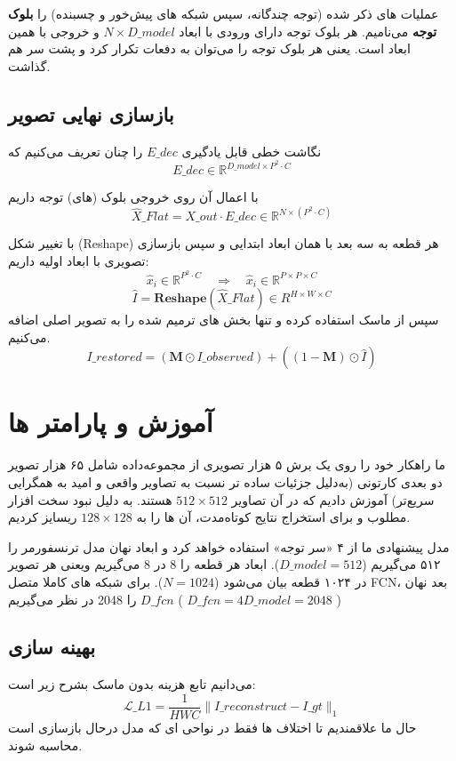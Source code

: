 عملیات های ذکر شده (توجه چندگانه، سپس شبکه های پیش‌خور و چسبنده) را \textbf{بلوک توجه} می‌نامیم. هر بلوک توجه دارای ورودی با ابعاد $ N \times D\_{model} $ و خروجی با همین ابعاد است. یعنی هر بلوک توجه را می‌توان به دفعات تکرار کرد و پشت سر هم گذاشت.

\subsection{بازسازی نهایی تصویر}
نگاشت خطی قابل یادگیری $E\_{dec}$ را چنان تعریف می‌کنیم که 
$$
E\_{dec} \in \mathbb{R}^{D\_{model} \times P^2 \cdot C}
$$

با اعمال آن روی خروجی بلوک (های) توجه داریم
$$
\hat{X}\_{Flat} = X\_{out} \cdot E\_{dec} \in \mathbb{R}^{N \times (P^2 \cdot C)}
$$

با تغییر شکل (Reshape) هر قطعه به سه بعد با همان ابعاد ابتدایی و سپس بازسازی تصویری با ابعاد اولیه داریم:
$$
\hat{x}_i \in \mathbb{R}^{P^2 \cdot C} \quad \Rightarrow \quad \hat{x}_i \in \mathbb{R}^{P \times P \times C}
$$
$$
\hat{I} = \mathbf{Reshape}(\hat{X}\_{Flat}) \in R^{H \times W \times C}
$$
سپس از ماسک استفاده کرده و تنها بخش های ترمیم شده را به تصویر اصلی اضافه می‌کنیم.
$$
I\_{restored} = (\mathbf{M} \odot I\_{observed}) + ((1-\mathbf{M}) \odot \hat{I})
$$

\section{آموزش و پارامتر ها}

ما راهکار خود را روی یک برش ۵ هزار تصویری از مجموعه‌داده  
\cite{danbooru2019Portraits}
شامل ۶۵ هزار تصویر دو بعدی کارتونی (به‌دلیل جزئیات ساده تر نسبت به تصاویر واقعی و امید به همگرایی سریع‌تر) آموزش دادیم که در آن  تصاویر $ 512 \times 512 $ هستند.  به دلیل نبود سخت افزار مطلوب و برای استخراج نتایج کوتاه‌مدت، آن ها را به $128 \times 128 $ ریسایز کردیم.

مدل پیشنهادی ما از ۴‌ «سر توجه» استفاده خواهد کرد و ابعاد نهان مدل ترنسفورمر را ۵۱۲ می‌گیریم ($D\_{model} = 512 $). ابعاد هر قطعه را 8 در 8 می‌گیریم ویعنی هر تصویر در ۱۰۲۴ قطعه بیان می‌شود ($N = 1024 $).
برای شبکه های کاملا متصل FCN، بعد نهان $D\_{fcn}$ را  2048 در نظر می‌گیریم (
$D\_{fcn}  = 4 D\_{model} = 2048$
)

\subsection{بهینه سازی}

می‌دانیم تابع هزینه  بدون ماسک بشرح زیر است:
$$
\mathcal{L}\_{L1} = \frac{1}{HWC} \| I\_{reconstruct} - I\_{gt} \|_1
$$
حال ما علاقمندیم تا اختلاف ها فقط در نواحی ای که مدل درحال بازسازی است محاسبه شوند.
